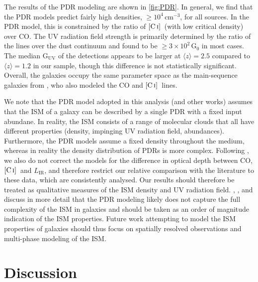 \documentclass[twocolumn]{aastex62}
\newcommand{\LIR}{\ensuremath{L_{\mathrm{IR}}}}
\newcommand{\avg}[1]{\ensuremath{\langle #1 \rangle}}
\newcommand{\CI}{\ensuremath{\mathrm{[C\, \textsc{i}]}}}
\begin{document}
The results of the PDR modeling are shown in \autoref{fig:PDR}.  In general, we
find that the PDR models predict fairly high densities,
$\ge 10^{4}$\,cm$^{-3}$, for all sources.  In the PDR model, this is
constrained by the ratio of \CI\ (with low critical density) over CO.  The UV
radiation field strength is primarily determined by the ratio of the lines over
the dust continuum and found to be $\ge 3\times10^{2}\,\mathrm{G}_{0}$ in most
cases.  The median G$_{\mathrm{UV}}$ of the detections appears to be larger at
$\avg{z}=2.5$ compared to $\avg{z}=1.2$ in our sample, though this difference
is not statistically significant.  Overall, the galaxies occupy the same
parameter space as the main-sequence galaxies from \citep{Valentino2018,
  Valentino2020a}, who also modeled the CO and \CI\ lines.

We note that the PDR model adopted in this analysis (and other works) assumes
that the ISM of a galaxy can be described by a single PDR with a fixed input
abundane.  In reality, the ISM consists of a range of molecular clouds that all
have different properties (density, impinging UV radiation field, abundances).
Furthermore, the PDR models assume a fixed density throughout the medium,
whereas in reality the density distribution of PDRs is more complex.  Following
\cite{Valentino2018}, we also do not correct the models for the difference in
optical depth between CO, \CI\ and \LIR, and therefore restrict our relative
comparison with the literature to these data, which are consistently analysed.
Our results should therefore be treated as qualitative measures of the ISM
density and UV radiation field.  \citet{Alaghband-Zadeh2013},
\citet{Bothwell2017}, \citet{Canameras2018} and \citet{Valentino2020a} discuss
in more detail that the PDR modeling likely does not capture the full
complexity of the ISM in galaxies and should be taken as an order of magnitude
indication of the ISM properties.  Future work attempting to model the ISM
properties of galaxies should thus focus on spatially resolved observations and
multi-phase modeling of the ISM.

\section{Discussion}
\label{sec:discussion}
\end{document}
